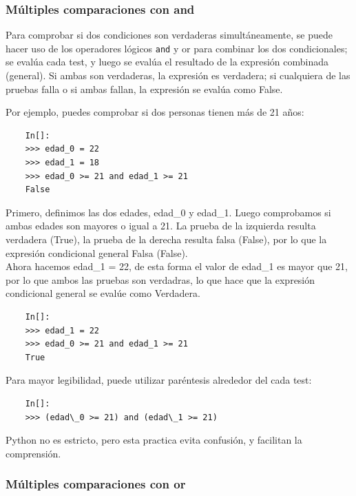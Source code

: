 \subsubsection{Múltiples comparaciones con {\ttfamily and}}


Para comprobar si dos condiciones son verdaderas simultáneamente, se puede hacer uso de los operadores lógicos  {\tt and} y {\ttfamily or} para combinar los dos condicionales; se evalúa cada test, y luego se evalúa el resultado de la expresión combinada (general). Si ambas son verdaderas, la expresión es verdadera; si cualquiera de las pruebas falla o si ambas fallan, la expresión se evalúa como False.

Por ejemplo, puedes comprobar si dos personas tienen más de 21 años:
\begin{lstlisting}
	In[]:
	>>> edad_0 = 22
	>>> edad_1 = 18
	>>> edad_0 >= 21 and edad_1 >= 21
	False
\end{lstlisting}

Primero, definimos las dos edades, {\ttfamily edad\_0} y {\ttfamily edad\_1}.  { }Luego comprobamos si ambas
edades son mayores o igual a 21. La prueba de la izquierda resulta verdadera (True),  la prueba de la derecha
resulta falsa (False), por lo que la expresión condicional general Falsa (False).\\



Ahora  hacemos {\ttfamily edad\_1 = 22}, de esta forma el valor de {\ttfamily edad\_1} es mayor que 21, por lo que ambos las pruebas son verdadras, lo que hace que la expresión condicional general se evalúe como Verdadera.

\begin{lstlisting}
	In[]:
	>>> edad_1 = 22
	>>> edad_0 >= 21 and edad_1 >= 21
	True
\end{lstlisting}

Para mayor legibilidad, puede utilizar paréntesis alrededor del cada test:
\begin{lstlisting}
	In[]:	
	>>> (edad\_0 >= 21) and (edad\_1 >= 21)
\end{lstlisting}
Python no es estricto, pero esta practica evita confusión, y facilitan la comprensión.



\subsubsection{Múltiples comparaciones con {\ttfamily or}}


